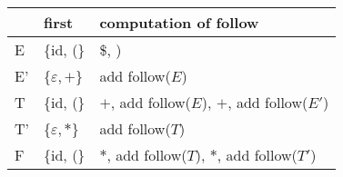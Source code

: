 \documentclass{standalone}
\providecommand\lightrule{%
	\arrayrulecolor{black!30}%
	\midrule[\lightrulewidth]%
	\arrayrulecolor{black}}
\begin{document}
\begin{tabularx}{\textwidth}{XXX}
    & first & computation of follow\\
    \midrule
        E
        &
        \{id, (\}
        &
        \$, )
        \\ \lightrule
        E'
        &
        \{\(\varepsilon, +\)\}
        &
        add follow(\(E\))
        \\ \lightrule
        T
        &
        \{id, (\}
        &
        \(+\), add follow(\(E\)), \(+\), add follow(\(E'\))
        \\ \lightrule
        T'
        &
        \{\(\varepsilon, *\)\}
        &
        add follow(\(T\))
        \\ \lightrule
        F
        &
        \{id, (\}
        &
        \(*\), add follow(\(T\)), \(*\), add follow(\(T'\))
\end{tabularx}
\end{document}
